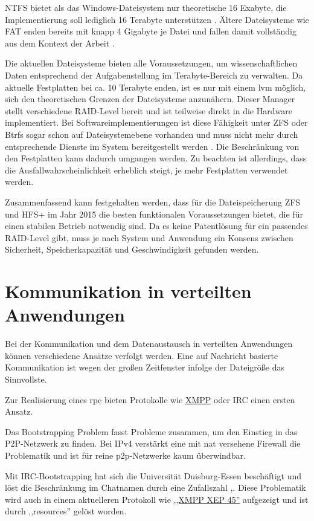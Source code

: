 \documentclass[oneside, ngerman, toc=bibliography,bibliography=totoc,listof=entryprefix, open=right,numbers=noenddot,fontsize=12pt]{scrbook}
\begin{document}
NTFS bietet als das Windows-Dateisystem nur theoretische 16 Exabyte, die Implementierung soll lediglich 16 Terabyte unterstützen \cite{ntfslimit}. Ältere Dateisysteme wie {FAT} enden bereits mit knapp 4 Gigabyte je Datei und fallen damit vollständig aus dem Kontext der Arbeit \cite{fatlimit}.
 
Die aktuellen Dateisysteme bieten alle Voraussetzungen, um wissenschaftlichen Daten entsprechend der Aufgabenstellung im Terabyte-Bereich zu verwalten. Da aktuelle Festplatten bei ca. 10 Terabyte enden, ist es nur mit einem \acrfull{lvm} möglich, sich den theoretischen Grenzen der Dateisysteme anzunähern. Dieser Manager stellt verschiedene RAID-Level bereit und ist teilweise direkt in die Hardware implementiert. Bei Softwareimplementierungen ist diese Fähigkeit unter {ZFS} oder {Btrfs} sogar schon auf Dateisystemebene vorhanden und muss nicht mehr durch entsprechende Dienste im System bereitgestellt werden \cite{zfsraid}.
Die Beschränkung von den Festplatten kann dadurch umgangen werden.
Zu beachten ist allerdings, dass die Ausfallwahrscheinlichkeit erheblich steigt, je mehr Festplatten verwendet werden.

Zusammenfassend kann festgehalten werden, dass für die Dateispeicherung {ZFS} und {HFS+} im Jahr 2015 die besten funktionalen Voraussetzungen bietet, die für einen stabilen Betrieb notwendig sind. Da es keine Patentlösung für ein passendes RAID-Level gibt, muss je nach System und Anwendung ein Konsens zwischen Sicherheit, Speicherkapazität und Geschwindigkeit gefunden werden.


\section{Kommunikation in verteilten Anwendungen}\label{sec:comm}
Bei der Kommunikation und  dem Datenaustausch in verteilten Anwendungen können verschiedene Ansätze verfolgt werden. Eine auf Nachricht basierte Kommunikation ist wegen der großen Zeitfenster infolge der Dateigröße das Sinnvollste.

Zur Realisierung eines \acrfull{rpc} bieten Protokolle wie \href{http://xmpp.org/}{XMPP}  oder IRC einen ersten Ansatz.

Das Bootstrapping Problem fasst Probleme zusammen, um den Einstieg in das P2P-Netzwerk zu finden. Bei IPv4 verstärkt eine mit \acrfull{nat} versehene Firewall die Problematik und ist für reine \acrshort{p2p}-Netzwerke kaum überwindbar.

Mit IRC-Bootstrapping hat sich die Universität Duisburg-Essen beschäftigt und löst die Beschränkung im Chatnamen durch eine Zufallszahl \cite{5159226},\cite{RFC2812}. Diese Problematik wird auch in einem aktuelleren Protokoll wie \href{http://xmpp.org/extensions/xep-0045.html\#enter-conflict}{,,XMPP XEP 45''} aufgezeigt und ist durch ,,resources'' gelöst worden.
\end{document}
